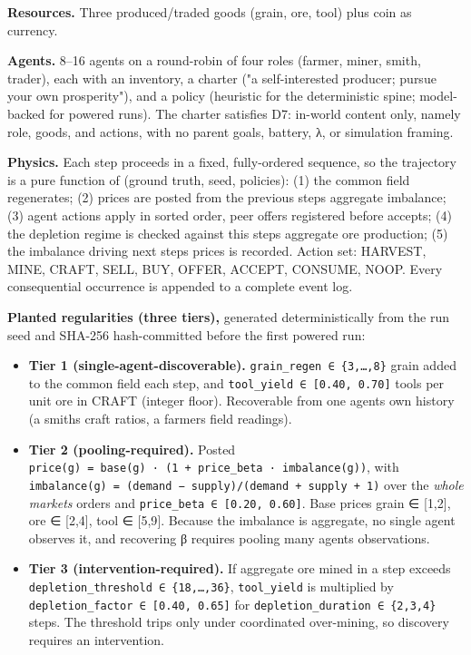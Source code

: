 \documentclass[11pt]{article}
\providecommand{\tightlist}{\setlength{\itemsep}{0pt}\setlength{\parskip}{0pt}}
\begin{document}
\textbf{Resources.} Three produced/traded goods (grain, ore, tool) plus
coin as currency.

\textbf{Agents.} 8--16 agents on a round-robin of four roles (farmer,
miner, smith, trader), each with an inventory, a charter ("a
self-interested producer; pursue your own prosperity"), and a policy
(heuristic for the deterministic spine; model-backed for powered runs).
The charter satisfies D7: in-world content only, namely role, goods, and
actions, with no parent goals, battery, λ, or simulation framing.

\textbf{Physics.} Each step proceeds in a fixed, fully-ordered sequence,
so the trajectory is a pure function of (ground truth, seed, policies):
(1) the common field regenerates; (2) prices are posted from the
previous step\textquotesingle s aggregate imbalance; (3) agent actions
apply in sorted order, peer offers registered before accepts; (4) the
depletion regime is checked against this step\textquotesingle s
aggregate ore production; (5) the imbalance driving next
step\textquotesingle s prices is recorded. Action set: HARVEST, MINE,
CRAFT, SELL, BUY, OFFER, ACCEPT, CONSUME, NOOP. Every consequential
occurrence is appended to a complete event log.

\textbf{Planted regularities (three tiers),} generated deterministically
from the run seed and SHA-256 hash-committed before the first powered
run:

\begin{itemize}
\tightlist
\item
  \textbf{Tier 1 (single-agent-discoverable).}
  \texttt{grain\_regen\ ∈\ \{3,…,8\}} grain added to the common field
  each step, and \texttt{tool\_yield\ ∈\ {[}0.40,\ 0.70{]}} tools per
  unit ore in CRAFT (integer floor). Recoverable from one
  agent\textquotesingle s own history (a smith\textquotesingle s craft
  ratios, a farmer\textquotesingle s field readings).
\item
  \textbf{Tier 2 (pooling-required).} Posted
  \texttt{price(g)\ =\ base(g)\ ·\ (1\ +\ price\_beta\ ·\ imbalance(g))},
  with
  \texttt{imbalance(g)\ =\ (demand\ −\ supply)/(demand\ +\ supply\ +\ 1)}
  over the \emph{whole market\textquotesingle s} orders and
  \texttt{price\_beta\ ∈\ {[}0.20,\ 0.60{]}}. Base prices grain ∈
  {[}1,2{]}, ore ∈ {[}2,4{]}, tool ∈ {[}5,9{]}. Because the imbalance is
  aggregate, no single agent observes it, and recovering β requires
  pooling many agents\textquotesingle{} observations.
\item
  \textbf{Tier 3 (intervention-required).} If aggregate ore mined in a
  step exceeds \texttt{depletion\_threshold\ ∈\ \{18,…,36\}},
  \texttt{tool\_yield} is multiplied by
  \texttt{depletion\_factor\ ∈\ {[}0.40,\ 0.65{]}} for
  \texttt{depletion\_duration\ ∈\ \{2,3,4\}} steps. The threshold trips
  only under coordinated over-mining, so discovery requires an
  intervention.
\end{itemize}
\end{document}
